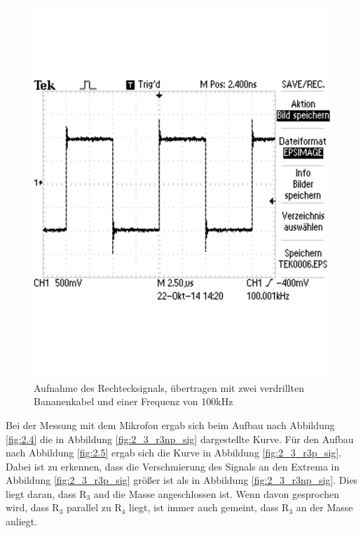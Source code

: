 \documentclass[12pt,a4paper]{article}
\begin{document}
\begin{figure}[H] 
  \centering
    \includegraphics[scale = 0.4]{2_3_vgl_1.pdf}
  	\caption[Aufnahme des Rechtecksignals, übertragen mit zwei verdrillten Bananenkabel und einer Frequenz von 100kHz]{Aufnahme des Rechtecksignals, übertragen mit zwei verdrillten Bananenkabel und einer Frequenz von 100kHz}
  \label{fig:2_3_vgl_1}
\end{figure}

Bei der Messung mit dem Mikrofon ergab sich beim Aufbau nach Abbildung \ref{fig:2.4} die in Abbildung \ref{fig:2_3_r3np_sig} dargestellte Kurve. Für den Aufbau nach Abbildung \ref{fig:2.5} ergab sich die Kurve in Abbildung \ref{fig:2_3_r3p_sig}. Dabei ist zu erkennen, dass die Verschmierung des Signals an den Extrema in Abbildung \ref{fig:2_3_r3p_sig} größer ist als in Abbildung \ref{fig:2_3_r3np_sig}. Dies liegt daran, dass R$_3$ and die Masse angeschlossen ist.
Wenn davon gesprochen wird, dass R$_3$ parallel zu R$_4$ liegt, ist immer auch gemeint, dass R$_3$ an der Masse anliegt.
\end{document}
